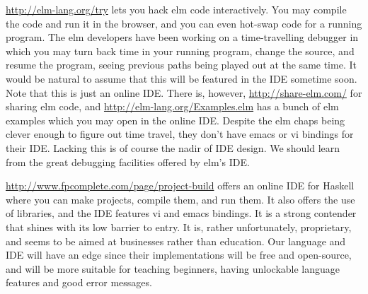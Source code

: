 \url{http://elm-lang.org/try} lets you hack elm code interactively. You may
compile the code and run it in the browser, and you can even hot-swap code for
a running program. The elm developers have been working on a time-travelling
debugger in which you may turn back time in your running program, change the
source, and resume the program, seeing previous paths being played out at the
same time. It would be natural to assume that this will be featured in the IDE
sometime soon.  Note that this is just an online IDE.  There is, however,
\url{http://share-elm.com/} for sharing elm code, and
\url{http://elm-lang.org/Examples.elm} has a bunch of elm examples which you
may open in the online IDE. Despite the elm chaps being clever enough to figure
out time travel, they don't have emacs or vi bindings for their IDE. Lacking
this is of course the nadir of IDE design. We should learn from the great 
debugging facilities offered by elm's IDE.

\url{http://www.fpcomplete.com/page/project-build} offers an online IDE for
Haskell where you can make projects, compile them, and run them. It also
offers the use of libraries, and the IDE features vi and emacs bindings.  It is
a strong contender that shines with its low barrier to entry. It is, rather
unfortunately, proprietary, and seems to be aimed at businesses rather than
education. Our language and IDE will have an edge since their implementations
will be free and open-source, and will be more suitable for teaching beginners,
having unlockable language features and good error messages.
